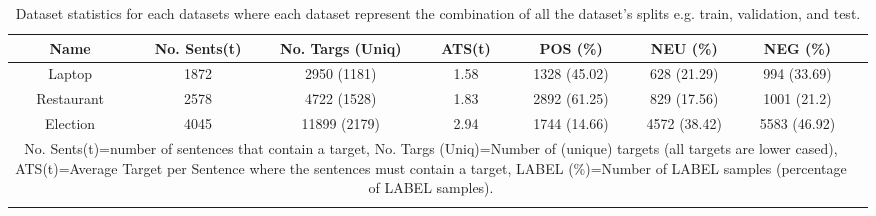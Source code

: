 \begin{longtable}{|c|c|c|c|c|c|c|c|}
\hline
Name &  No. Sents(t) &  No. Targs (Uniq) &  ATS(t) & POS (\%) & NEU (\%) & NEG (\%) \\
\hline
Laptop &              1872 &         2950 (1181) &    1.58 &  1328 (45.02) &   628 (21.29) &   994 (33.69) \\
\hline
Restaurant &              2578 &         4722 (1528) &    1.83 &  2892 (61.25) &   829 (17.56) &   1001 (21.2) \\
\hline
Election &              4045 &        11899 (2179) &    2.94 &  1744 (14.66) &  4572 (38.42) &  5583 (46.92) \\
\hline
\multicolumn{7}{|p{0.9\linewidth}|}{No. Sents(t)=number of sentences that contain a target, No. Targs (Uniq)=Number of (unique) targets (all targets are lower cased), ATS(t)=Average Target per Sentence where the sentences must contain a target, LABEL (\%)=Number of LABEL samples (percentage of LABEL samples).} \\
\hline
\caption{Dataset statistics for each datasets where each dataset represent the combination of all the dataset's splits e.g. train, validation, and test.}
\label{table:augmentation_combined_dataset_statistics}
\end{longtable}